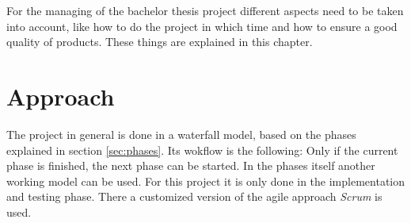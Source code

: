 For the managing of the bachelor thesis project different aspects need to be taken into account, like how to do the project in which time and how to ensure a good quality of products. These things are explained in this chapter.

\section{Approach}
The project in general is done in a waterfall model, based on the phases explained in section \ref{sec:phases}. Its wokflow is the following: Only if the current phase is finished, the next phase can be started. In the phases itself another working model can be used. For this project it is only done in the implementation and testing phase. There a customized version of the agile approach \textit{Scrum} is used. 

